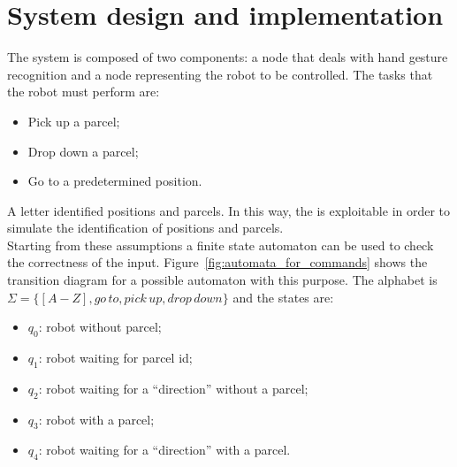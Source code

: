 \documentclass[../thesis.tex]{subfiles}
\begin{document}
\section{System design and implementation}\label{sec:system_design_and_implementation}
The system is composed of two components: a node that deals with  hand gesture recognition and a node representing the robot to be controlled. The tasks that the robot must perform are:
\begin{itemize}
    \item Pick up a parcel;
    \item Drop down a parcel;
    \item Go to a predetermined position.
\end{itemize}
A letter identified positions and parcels. In this way, the  is exploitable in order to simulate the identification of positions and parcels.\\
Starting from these assumptions a finite state automaton can be used to check the correctness of the input. Figure~\ref{fig:automata_for_commands} shows the transition diagram for a possible automaton with this purpose. The alphabet is $\Sigma = \{[A-Z], go\, to, pick\, up, drop\, down\}$ and the states are:
\begin{itemize}
    \item \textbf{$q_0$}: robot without parcel; 
    \item \textbf{$q_1$}: robot waiting for parcel id; 
    \item \textbf{$q_2$}: robot waiting for a ``direction'' without a parcel;
    \item \textbf{$q_3$}: robot with a parcel;
    \item \textbf{$q_4$}: robot waiting for a ``direction'' with a parcel.
\end{itemize}
\end{document}
